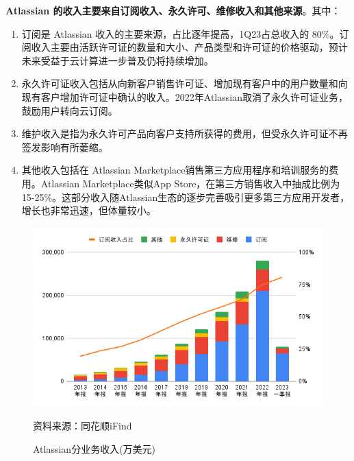 \textbf{Atlassian 的收入主要来自订阅收入、永久许可、维修收入和其他来源}。其中：
\begin{enumerate}
    \item 订阅是 Atlassian 收入的主要来源，占比逐年提高，1Q23占总收入的 80\%。订阅收入主要由活跃许可证的数量和大小、产品类型和许可证的价格驱动，预计未来受益于云计算进一步普及仍将持续增加。
    \item 永久许可证收入包括从向新客户销售许可证、增加现有客户中的用户数量和向现有客户增加许可证中确认的收入。2022年Atlassian取消了永久许可证业务，鼓励用户转向云订阅。
    \item 维护收入是指为永久许可产品向客户支持所获得的费用，但受永久许可证不再签发影响有所萎缩。
    \item 其他收入包括在 Atlassian Marketplace销售第三方应用程序和培训服务的费用。Atlassian Marketplace类似App Store，在第三方销售收入中抽成比例为15-25\%。这部分收入随Atlassian生态的逐步完善吸引更多第三方应用开发者，增长也非常迅速，但体量较小。
\end{enumerate}
\begin{figure}[H]
    \caption{Atlassian分业务收入(万美元)}
    \begin{center}
        \includegraphics[width=\linewidth]{img/revenue.png}
    \end{center}
    \footnotesize{资料来源：同花顺iFind}
\end{figure}

